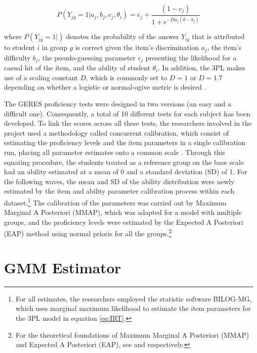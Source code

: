 \documentclass[a4paper, 12pt]{article}
\begin{document}
 
\begin{equation} \label{eq:IRT}
P(Y_{jg} = 1 \vert a_j,b_j,c_j,\theta_i) = c_j + \frac{(1-c_j)}{1+e^{-Da_j(\theta-b_j)}}
\end{equation}


where $P(Y_{jg} = 1 \vert)$ denotes the probability of the answer $Y_{ig}$ that is attributed to student $i$ in group $g$ is correct given the item's discrimination $a_j$, the item's difficulty $b_j$, the pseudo-guessing parameter $c_j$ presenting the likelihood for a casual hit of the item, and the ability of student $\theta_i$. In addition, the 3PL makes use of a scaling constant $D$, which is commonly set to $D=1$ or $D=1.7$ depending on whether a logistic or normal-ogive metric is desired \citep{LeBeau2017, de2013theory}.

The GERES proficiency tests were designed in two versions (an easy and a difficult one). Consequently, a total of 10 different tests for each subject has been developed. To link the scores across all these tests, the researchers involved in the project used a methodology called concurrent calibration, which consist of estimating the proficiency levels and the item parameters in a single calibration run, placing all parameter estimates onto a common scale \citep{kang2012linking}. Through this equating procedure, the students treated as a reference group on the base scale had an ability estimated at a mean of 0 and a standard deviation (SD) of 1. For the following waves, the mean and SD of the ability distribution were newly estimated by the item and ability parameter calibration process within each dataset.\footnote{For all estimates, the researchers employed the statistic software BILOG-MG, which uses marginal maximum likelihood to estimate the item parameters for the 3PL model in equation \eqref{eq:IRT}.} The calibration of the parameters was carried out by Maximum Marginal A Posteriori (MMAP), which was adapted for a model with multiple groups, and the proficiency levels were estimated by the Expected A Posteriori (EAP) method using normal prioris for all the groups.\footnote{For the theoretical foundations of Maximum Marginal A Posteriori (MMAP) and Expected A Posteriori (EAP), see \citet{doucet2002marginal} and \citet{kolen2010psychometric} respectively.} 









\section{GMM Estimator} \label{GMM}
\end{document}
